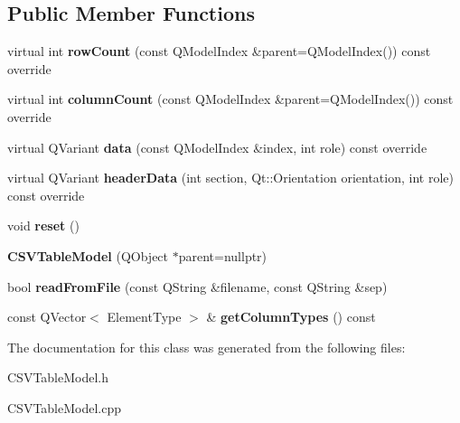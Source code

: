 \subsection*{Public Member Functions}
\begin{DoxyCompactItemize}
\item 
\mbox{\label{class_c_s_v_table_model_a642fa1bcfcd66866097ccb6c54e03d63}} 
virtual int {\bfseries row\+Count} (const Q\+Model\+Index \&parent=Q\+Model\+Index()) const override
\item 
\mbox{\label{class_c_s_v_table_model_a2c26cec87760ec9a8e01b5ef2557afff}} 
virtual int {\bfseries column\+Count} (const Q\+Model\+Index \&parent=Q\+Model\+Index()) const override
\item 
\mbox{\label{class_c_s_v_table_model_a619081c765d0f158d56d340877c19003}} 
virtual Q\+Variant {\bfseries data} (const Q\+Model\+Index \&index, int role) const override
\item 
\mbox{\label{class_c_s_v_table_model_a34ae4322e1457c4cd94b6f56528fa73f}} 
virtual Q\+Variant {\bfseries header\+Data} (int section, Qt\+::\+Orientation orientation, int role) const override
\item 
\mbox{\label{class_c_s_v_table_model_aceb7a383cc3c913b5de20e2355966ae3}} 
void {\bfseries reset} ()
\item 
\mbox{\label{class_c_s_v_table_model_a144e0b4ab63059f34e530283eff40359}} 
{\bfseries C\+S\+V\+Table\+Model} (Q\+Object $\ast$parent=nullptr)
\item 
\mbox{\label{class_c_s_v_table_model_a86d3175754ae68608d25f3b599007d66}} 
bool {\bfseries read\+From\+File} (const Q\+String \&filename, const Q\+String \&sep)
\item 
\mbox{\label{class_c_s_v_table_model_a1ad5276d895898f055d3518f052edec7}} 
const Q\+Vector$<$ Element\+Type $>$ \& {\bfseries get\+Column\+Types} () const
\end{DoxyCompactItemize}


The documentation for this class was generated from the following files\+:\begin{DoxyCompactItemize}
\item 
C\+S\+V\+Table\+Model.\+h\item 
C\+S\+V\+Table\+Model.\+cpp\end{DoxyCompactItemize}
